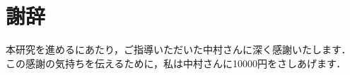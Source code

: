 \chapter*{謝辞}
\label{sec:thanks}

本研究を進めるにあたり，ご指導いただいた中村さんに深く感謝いたします．
この感謝の気持ちを伝えるために，私は中村さんに10000円をさしあげます．




\thanksend


%
%
%
%
%
%
%
